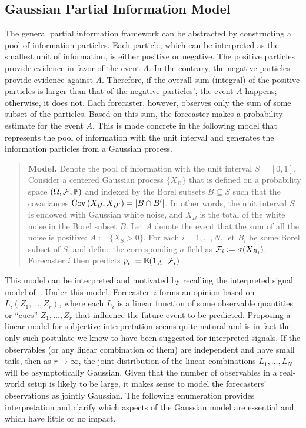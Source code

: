 \documentclass[11pt]{article}
\renewcommand{\P}{\mathbb{P}}
\newcommand{\E}{\mathbb{E}}
\theoremstyle{definition}
\theoremstyle{definition}
\def\one{{\bf 1}}
\def\F{{\cal F}}
\def\P{{\mathbb P}}
\def\E{{\mathbb E}}
\def\Cov{{\rm Cov}\,}
\def\|{\, | \,}
\begin{document}
\subsection{Gaussian Partial Information Model}
\label{ss:Gaussian}
The general partial information framework can be abstracted by constructing a pool of information particles. Each particle, which can be interpreted as the smallest unit of information, is either positive or negative. The positive particles provide evidence in favor of the event $A$. 
In the contrary, the negative particles provide evidence against $A$. Therefore, if the overall sum (integral) of the positive particles is larger than that of the negative particles', the event $A$ happens; otherwise, it does not. Each forecaster, however, observes only the sum of some subset of the particles. Based on this sum, the forecaster makes a probability estimate for the event $A$. This is made concrete in the following model that  represents the pool of information with the unit interval and generates the information particles from a Gaussian process. 

\begin{quote}
{\bf Model.} Denote the pool of information with the unit interval $S = [0,1]$. Consider a centered Gaussian process $\{X_B\}$ that is defined on a probability space $(\Omega
, \F , \P)$ and indexed by the Borel subsets $B \subseteq S$ such that the
covariances $\Cov (X_B , X_{B'}) = |B \cap B'|$.  In other words, the
unit interval $S$ is endowed with Gaussian white noise, and $X_B$ is the
total of the white noise in the Borel subset $B$.  Let $A$ denote the
event that the sum of all the noise is positive: $A := \{ X_S > 0 \}$.
For each $i = 1, \dots, N$, let $B_i$ be some Borel subset of $S$, and
define the corresponding $\sigma$-field as $\F_i := \sigma (X_{B_i})$. Forecaster $i$ then predicts $p_i :=
\E (\one_A \| \F_i)$.
\end{quote}

This model can be interpreted and motivated by recalling the interpreted signal
model of~\citet{broomell2009experts}. Under this model, 
Forecaster~$i$ forms an opinion based on $L_i (Z_1 , \ldots , Z_r)$,
where each $L_i$ is a linear function of some observable quantities or ``cues''
$Z_1 , \ldots , Z_r$ that influence the future event to be predicted.  Proposing a linear model for subjective
interpretation seems quite natural and is in fact the only such
postulate we know to have been suggested for interpreted signals.  If
the observables (or any linear combination of them) are independent
and have small tails, then as $r \to \infty$, the joint distribution
of the linear combinations $L_1 , \ldots , L_N$ will be asymptotically
Gaussian.  Given that the number of observables in a real-world setup is likely to be large, it makes sense
to model the forecasters' observations as jointly Gaussian.  The
following enumeration provides interpretation and clarify which
aspects of the Gaussian model are essential and which have little or
no impact.
\end{document}
